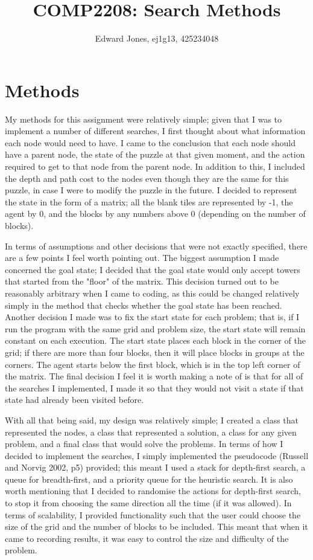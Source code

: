 \documentclass[a4paper,10pt]{article}
\begin{document}
\title{COMP2208: Search Methods}
\author{Edward Jones, ej1g13, 425234048}
\date{}
\maketitle

\section{Methods}

My methods for this assignment were relatively simple; given that I was to implement a number of different searches, I first thought about what information each node would need to have.
I came to the conclusion that each node should have a parent node, the state of the puzzle at that given moment, and the action required to get to that node from the parent node. 
In addition to this, I included the depth and path cost to the nodes even though they are the same for this puzzle, in case I were to modify the puzzle in the future.
I decided to represent the state in the form of a matrix; all the blank tiles are represented by -1, the agent by 0, and the blocks by any numbers above 0 (depending on the number of blocks). 

In terms of assumptions and other decisions that were not exactly specified, there are a few points I feel worth pointing out.
The biggest assumption I made concerned the goal state; I decided that the goal state would only accept towers that started from the "floor" of the matrix. 
This decision turned out to be reasonably arbitrary when I came to coding, as this could be changed relatively simply in the method that checks whether the goal state has been reached.
Another decision I made was to fix the start state for each problem; that is, if I run the program with the same grid and problem size, the start state will remain constant on each execution.
The start state places each block in the corner of the grid; if there are more than four blocks, then it will place blocks in groups at the corners. 
The agent starts below the first block, which is in the top left corner of the matrix.
The final decision I feel it is worth making a note of is that for all of the searches I implemented, I made it so that they would not visit a state if that state had already been visited before.

With all that being said, my design was relatively simple; I created a class that represented the nodes, a class that represented a solution, a class for any given problem, and a final class that would solve the problems.
In terms of how I decided to implement the searches, I simply implemented the pseudocode (Russell and Norvig 2002, p5) provided; this meant I used a stack for depth-first search, a queue for breadth-first, and a priority queue for the heuristic search.
It is also worth mentioning that I decided to randomise the actions for depth-first search, to stop it from choosing the same direction all the time (if it was allowed).
In terms of scalability, I provided functionality such that the user could choose the size of the grid and the number of blocks to be included. 
This meant that when it came to recording results, it was easy to control the size and difficulty of the problem. 
\end{document}
